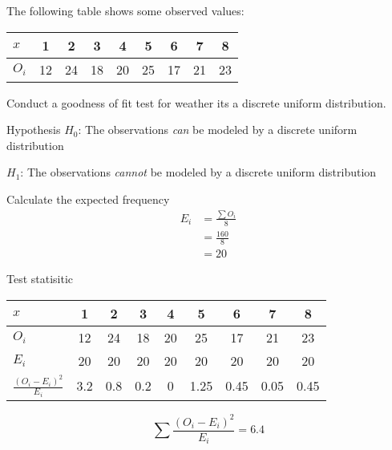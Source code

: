             \begin{example}
            {
                The following table shows some observed values:
                \begin{center}
                \begin{tabular}{l|c|c|c|c|c|c|c|c}
                $x$ & 1 & 2 & 3 & 4 & 5 & 6 & 7 & 8 \\
                \hline
                $O_i$ & 12 & 24 & 18 & 20 & 25 & 17 & 21 & 23 \\
                \end{tabular}
                \end{center}
                Conduct a goodness of fit test for weather its a discrete uniform distribution.
            }

            \begin{step}{Hypothesis}
            $H_0$: The observations \textit{can} be modeled by a discrete uniform distribution

            $H_1$: The observations \textit{cannot} be modeled by a discrete uniform distribution
            \end{step}

            \begin{step}{Calculate the expected frequency}
            \begin{align*}
            E_i &= \frac{\sum{O_i}}{8} \\
            &= \frac{160}{8} \\
            &= 20
            \end{align*}
            \end{step}

            \begin{step}{Test statisitic}
            \begin{center}
            \begin{tabular}{l|c|c|c|c|c|c|c|c}
            $x$ & 1 & 2 & 3 & 4 & 5 & 6 & 7 & 8 \\
            \hline
            $O_i$                                    & 12   & 24    & 18    & 20  & 25    & 17    & 21    & 23 \\
            $E_i$                                    & 20   & 20    & 20    & 20  & 20    & 20    & 20    & 20 \\
            $\displaystyle\frac{(O_i - E_i)^2}{E_i}$ & 3.2  & 0.8   & 0.2   & 0   & 1.25  & 0.45  & 0.05  & 0.45 \\
            \end{tabular}
            \end{center}
            $$
            \sum{\frac{(O_i - E_i)^2}{E_i}} = 6.4
            $$
            \end{step}


\end{example}
